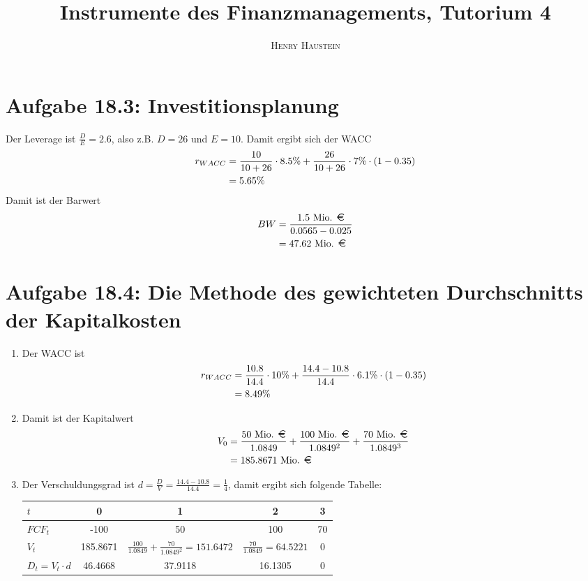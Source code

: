\documentclass{article}
\title{\textbf{Instrumente des Finanzmanagements, Tutorium 4}}
\author{\textsc{Henry Haustein}}
\date{}
\begin{document}
	\maketitle
	
	\section*{Aufgabe 18.3: Investitionsplanung}
	Der Leverage ist $\frac{D}{E}=2.6$, also z.B. $D=26$ und $E=10$. Damit ergibt sich der WACC
	\begin{align}
		r_{WACC} &= \frac{10}{10+26}\cdot 8.5\% + \frac{26}{10+26}\cdot 7\%\cdot (1-0.35) \notag \\
		&= 5.65\% \notag
	\end{align}
	Damit ist der Barwert
	\begin{align}
		BW &= \frac{1.5\text{ Mio. \EUR}}{0.0565-0.025} \notag \\
		&= 47.62\text{ Mio. \EUR}\notag
	\end{align}

	\section*{Aufgabe 18.4: Die Methode des gewichteten Durchschnitts der Kapitalkosten}
	\begin{enumerate}[label=(\alph*)]
		\item Der WACC ist
		\begin{align}
			r_{WACC} &= \frac{10.8}{14.4}\cdot 10\% + \frac{14.4-10.8}{14.4}\cdot 6.1\%\cdot (1-0.35) \notag \\
			&= 8.49\% \notag
		\end{align}
		\item Damit ist der Kapitalwert
		\begin{align}
			V_0 &= \frac{50\text{ Mio. \EUR}}{1.0849} + \frac{100\text{ Mio. \EUR}}{1.0849^2} + \frac{70\text{ Mio. \EUR}}{1.0849^3} \notag \\
			&= 185.8671\text{ Mio. \EUR} \notag
		\end{align}
		\item Der Verschuldungsgrad ist $d=\frac{D}{V}=\frac{14.4-10.8}{14.4}=\frac{1}{4}$, damit ergibt sich folgende Tabelle:
		\begin{center}
			\begin{tabular}{l|c|c|c|c}
				$t$ & 0 & 1 & 2 & 3 \\
				\hline
				$FCF_t$ & -100 & 50 & 100 & 70 \\
				$V_t$ & 185.8671 & $\frac{100}{1.0849} + \frac{70}{1.0849^2}=151.6472$ & $\frac{70}{1.0849}=64.5221$ & 0 \\
				$D_t=V_t\cdot d$ & 46.4668 & 37.9118 & 16.1305 & 0
			\end{tabular}
		\end{center}
	\end{enumerate}
\end{document}
